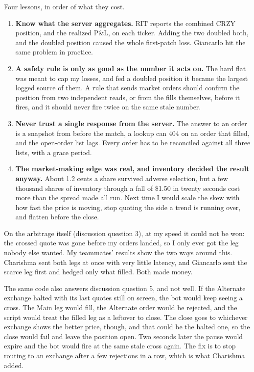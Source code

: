 Four lessons, in order of what they cost.
\begin{enumerate}
  \item \textbf{Know what the server aggregates.} RIT reports the combined CRZY
        position, and the realized P\&L, on each ticker. Adding the two doubled
        both, and the doubled position caused the whole first-patch loss. Giancarlo
        hit the same problem in practice.
  \item \textbf{A safety rule is only as good as the number it acts on.} The hard
        flat was meant to cap my losses, and fed a doubled position it became the
        largest logged source of them. A rule that sends market orders should
        confirm the position from two independent reads, or from the fills
        themselves, before it fires, and it should never fire twice on the same
        stale number.
  \item \textbf{Never trust a single response from the server.} The answer to an
        order is a snapshot from before the match, a lookup can 404 on an order that
        filled, and the open-order list lags. Every order has to be reconciled
        against all three lists, with a grace period.
  \item \textbf{The market-making edge was real, and inventory decided the result
        anyway.} About 1.2 cents a share survived adverse selection, but a few
        thousand shares of inventory through a fall of \$1.50 in twenty seconds
        cost more than the spread made all run. Next time I would scale the skew
        with how fast the price is moving, stop quoting the side a trend is
        running over, and flatten before the close.
\end{enumerate}
On the arbitrage itself (discussion question 3), at my speed it could not be won:
the crossed quote was gone before my orders landed, so I only ever got the leg
nobody else wanted. My teammates' results show the two ways around this. Charishma
sent both legs at once with very little latency, and Giancarlo sent the scarce leg
first and hedged only what filled. Both made money.

The same code also answers discussion question 5, and not well. If the Alternate
exchange halted with its last quotes still on screen, the bot would keep seeing a
cross. The Main leg would fill, the Alternate order would be rejected, and the
script would treat the filled leg as a leftover to close. The close goes to whichever
exchange shows the better price, though, and that could be the halted one, so the
close would fail and leave the position open. Two seconds later the pause would
expire and the bot would fire at the same stale cross again. The fix is to stop
routing to an exchange after a few rejections in a row, which is what Charishma
added.

